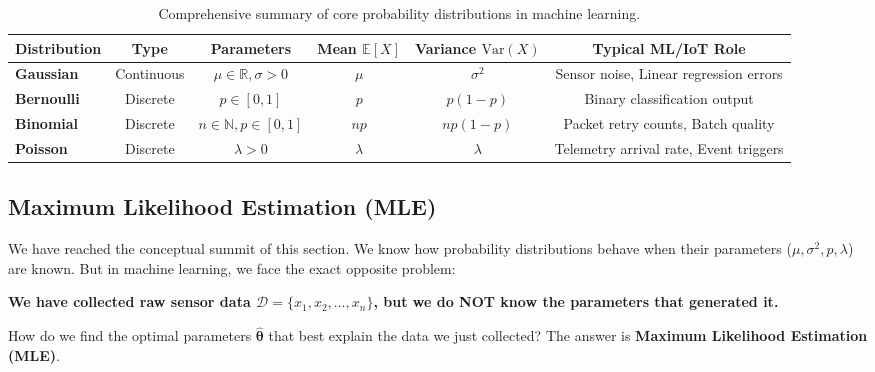 \begin{table}[htbp]
\centering
\caption{Comprehensive summary of core probability distributions in machine learning.}\label{tab:distribution_summary}
\small
\begin{tabular}{lccccc}
\toprule
\textbf{Distribution} & \textbf{Type} & \textbf{Parameters} & \textbf{Mean $\mathbb{E}[X]$} & \textbf{Variance $\text{Var}(X)$} & \textbf{Typical ML/IoT Role} \\
\midrule
\textbf{Gaussian} & Continuous & $\mu \in \mathbb{R}, \sigma > 0$ & $\mu$ & $\sigma^2$ & Sensor noise, Linear regression errors \\
\textbf{Bernoulli} & Discrete & $p \in [0, 1]$ & $p$ & $p(1 - p)$ & Binary classification output \\
\textbf{Binomial} & Discrete & $n \in \mathbb{N}, p \in [0, 1]$ & $np$ & $np(1 - p)$ & Packet retry counts, Batch quality \\
\textbf{Poisson} & Discrete & $\lambda > 0$ & $\lambda$ & $\lambda$ & Telemetry arrival rate, Event triggers \\
\bottomrule
\end{tabular}
\end{table}

\subsection{Maximum Likelihood Estimation (MLE)}\label{subsec:prob_mle}

We have reached the conceptual summit of this section. We know how probability distributions behave when their parameters ($\mu, \sigma^2, p, \lambda$) are known. But in machine learning, we face the exact opposite problem:
\begin{center}
\textbf{We have collected raw sensor data $\mathcal{D} = \{x_1, x_2, \dots, x_n\}$, but we do NOT know the parameters that generated it.}
\end{center}
How do we find the optimal parameters $\hat{\mathbf{\theta}}$ that best explain the data we just collected? The answer is \textbf{Maximum Likelihood Estimation (MLE)}.

